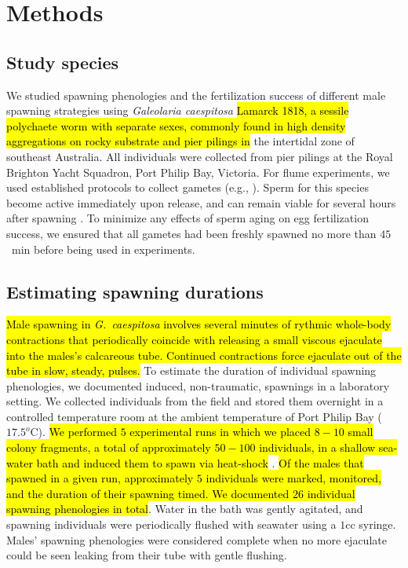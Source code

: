 \documentclass{article}
\begin{document}
\section{Methods} 
	\label{sec:methods}

	\subsection*{Study species}
	We studied spawning phenologies and the fertilization success of different male spawning strategies using \textit{Galeolaria caespitosa} \hl{Lamarck 1818, a sessile polychaete worm with separate sexes, commonly found in high density aggregations on rocky substrate and pier pilings in} the intertidal zone of southeast Australia. All individuals were collected from pier pilings at the Royal Brighton Yacht Squadron, Port Philip Bay, Victoria. For flume experiments, we used established protocols to collect gametes (e.g., \citealt{MarshallEvans2005a, MarshallEvans2005b}). Sperm for this species become active immediately upon release, and can remain viable for several hours after spawning \citep{Kupriyanova2013}. To minimize any effects of sperm aging on egg fertilization success, we ensured that all gametes had been freshly spawned no more than $45$~min before being used in experiments.

	\subsection*{Estimating spawning durations}
	\hl{Male spawning in \textit{G.~caespitosa} involves several minutes of rythmic whole-body contractions that periodically coincide with releasing a small viscous ejaculate into the males's calcareous tube. Continued contractions force ejaculate out of the tube in slow, steady, pulses.} To estimate the duration of individual spawning phenologies, we documented induced, non-traumatic, spawnings in a laboratory setting. We collected individuals from the field and stored them overnight in a controlled temperature room at the ambient temperature of Port Philip Bay ($17.5^o$C). \hl{We performed $5$ experimental runs in which we placed $8-10$ small colony fragments, a total of approximately $50-100$ individuals, in a shallow sea-water bath and induced them to spawn via heat-shock} \citep{Strathmann1987}. \hl{Of the males that spawned in a given run, approximately $5$ individuals were marked, monitored, and the duration of their spawning timed. We documented $26$ individual spawning phenologies in total}. Water in the bath was gently agitated, and spawning individuals were periodically flushed with seawater using a $1$cc syringe. Males' spawning phenologies were considered complete when no more ejaculate could be seen leaking from their tube with gentle flushing. 
\end{document}
